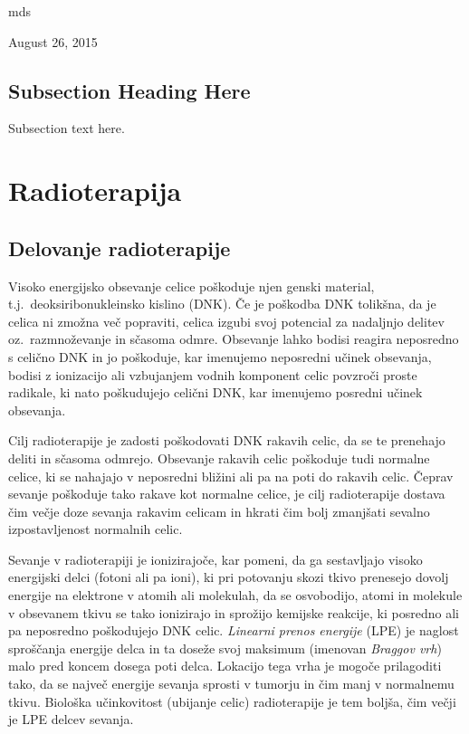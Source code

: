 \documentclass[journal]{IEEEtran}
\begin{document}
\hfill mds
 
\hfill August 26, 2015

\subsection{Subsection Heading Here}
Subsection text here.


\section{Radioterapija}

\subsection{Delovanje radioterapije}

Visoko energijsko obsevanje celice poškoduje njen genski material, t.j.~deoksiribonukleinsko kislino (DNK). Če je poškodba DNK tolikšna, da je celica ni zmožna več popraviti, celica izgubi svoj potencial za nadaljnjo delitev oz.~razmnoževanje in sčasoma odmre. Obsevanje lahko bodisi reagira neposredno s celično DNK in jo poškoduje, kar imenujemo neposredni učinek obsevanja, bodisi z ionizacijo ali vzbujanjem vodnih komponent celic povzroči proste radikale, ki nato poškudujejo celični DNK, kar imenujemo posredni učinek obsevanja.

Cilj radioterapije je zadosti poškodovati DNK rakavih celic, da se te prenehajo deliti in sčasoma odmrejo. Obsevanje rakavih celic poškoduje tudi normalne celice, ki se nahajajo v neposredni bližini ali pa na poti do rakavih celic. Čeprav sevanje poškoduje tako rakave kot normalne celice, je cilj radioterapije dostava čim večje doze sevanja rakavim celicam in hkrati čim bolj zmanjšati sevalno izpostavljenost normalnih celic.

Sevanje v radioterapiji je ionizirajoče, kar pomeni, da ga sestavljajo visoko energijski delci (fotoni ali pa ioni), ki pri potovanju skozi tkivo prenesejo dovolj energije na elektrone v atomih ali molekulah, da se osvobodijo, atomi in molekule v obsevanem tkivu se tako ionizirajo in sprožijo kemijske reakcije, ki posredno ali pa neposredno poškodujejo DNK celic. \emph{Linearni prenos energije} (LPE) je naglost sproščanja energije delca in ta doseže svoj maksimum (imenovan \emph{Braggov vrh}) malo pred koncem dosega poti delca. Lokacijo tega vrha je mogoče prilagoditi tako, da se največ energije sevanja sprosti v tumorju in čim manj v normalnemu tkivu. Biološka učinkovitost (ubijanje celic) radioterapije je tem boljša, čim večji je LPE delcev sevanja.
\end{document}
